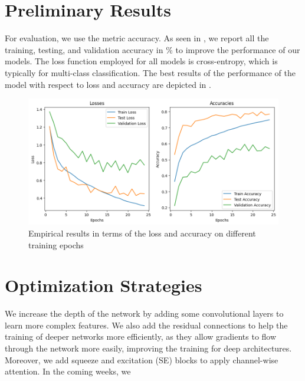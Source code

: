 \section{Preliminary Results}
\label{sec:result}

For evaluation, we use the metric accuracy. 
As seen in , 
we report all the training, testing, and validation accuracy in \% to improve the performance of our models. 
The loss function employed for all models is cross-entropy, which is typically for multi-class classification. 
The best results of the performance of the model with respect to loss and accuracy are depicted in .

\begin{figure}[t]
  \centering
   \includegraphics[width=0.95\linewidth]{output.png}
   \caption{Empirical results in terms of the loss and accuracy on different training epochs}
   \label{fig:result}
\end{figure}

\section{Optimization Strategies}
\label{sec:optim}
We increase the depth of the network by adding some convolutional layers to learn more complex features. 
We also add the residual connections to help the training of deeper networks more efficiently, 
as they allow gradients to flow through the network more easily, improving the training for deep architectures. 
Moreover, 
we add squeeze and excitation (SE) blocks to apply channel-wise attention. 
In the coming weeks, 
we 

